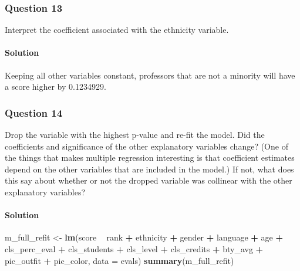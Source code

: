 \documentclass[]{article}
\newenvironment{Shaded}{\begin{snugshade}}{\end{snugshade}}
\newcommand{\KeywordTok}[1]{\textcolor[rgb]{0.13,0.29,0.53}{\textbf{#1}}}
\newcommand{\DataTypeTok}[1]{\textcolor[rgb]{0.13,0.29,0.53}{#1}}
\newcommand{\StringTok}[1]{\textcolor[rgb]{0.31,0.60,0.02}{#1}}
\newcommand{\OperatorTok}[1]{\textcolor[rgb]{0.81,0.36,0.00}{\textbf{#1}}}
\newcommand{\NormalTok}[1]{#1}
\let\oldparagraph\paragraph
\renewcommand{\paragraph}[1]{\oldparagraph{#1}\mbox{}}
\begin{document}
\subsubsection{Question 13}\label{question-13}

Interpret the coefficient associated with the ethnicity variable.

\paragraph{Solution}\label{solution-12}

Keeping all other variables constant, professors that are not a minority
will have a score higher by 0.1234929.

\subsubsection{Question 14}\label{question-14}

Drop the variable with the highest p-value and re-fit the model. Did the
coefficients and significance of the other explanatory variables change?
(One of the things that makes multiple regression interesting is that
coefficient estimates depend on the other variables that are included in
the model.) If not, what does this say about whether or not the dropped
variable was collinear with the other explanatory variables?

\paragraph{Solution}\label{solution-13}

\begin{Shaded}
\begin{Highlighting}[]
\NormalTok{m_full_refit <-}\StringTok{ }\KeywordTok{lm}\NormalTok{(score }\OperatorTok{~}\StringTok{ }\NormalTok{rank }\OperatorTok{+}\StringTok{ }\NormalTok{ethnicity }\OperatorTok{+}\StringTok{ }\NormalTok{gender }\OperatorTok{+}\StringTok{ }\NormalTok{language }\OperatorTok{+}\StringTok{ }\NormalTok{age }\OperatorTok{+}\StringTok{ }\NormalTok{cls_perc_eval }
             \OperatorTok{+}\StringTok{ }\NormalTok{cls_students }\OperatorTok{+}\StringTok{ }\NormalTok{cls_level }\OperatorTok{+}\StringTok{ }\NormalTok{cls_credits }\OperatorTok{+}\StringTok{ }\NormalTok{bty_avg }
             \OperatorTok{+}\StringTok{ }\NormalTok{pic_outfit }\OperatorTok{+}\StringTok{ }\NormalTok{pic_color, }\DataTypeTok{data =}\NormalTok{ evals)}
\KeywordTok{summary}\NormalTok{(m_full_refit)}
\end{Highlighting}
\end{Shaded}
\end{document}
